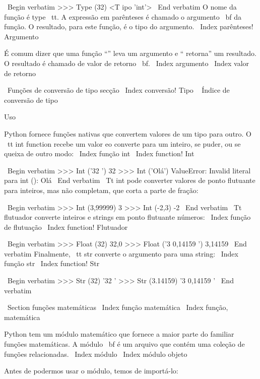\documentclass[10pt]{book}
\begin{document}
{\ Begin {verbatim}
>>> Type (32)
<T ipo 'int'>
\ End {verbatim}
%
O nome da função é {type \ tt}. A expressão em parênteses
é chamado o argumento {\ bf} da função. O resultado, para este
função, é o tipo do argumento.
\ Index {parênteses! Argumento}

É comum dizer que uma função ``'' leva um argumento e `` retorna''
um resultado. O resultado é chamado de valor de retorno {\ bf}.
\ Index {argumento}
\ Index {valor de retorno}


\ {Funções de conversão de tipo} secção
\ Index {conversão! Tipo}
\ {} Índice de conversão de tipo

Uso%


Python fornece funções nativas que convertem valores
de um tipo para outro. O {\ tt int} function recebe um valor eo
converte para um inteiro, se puder, ou se queixa de outro modo:
\ Index {função int}
\ Index {function! Int}

\ Begin {verbatim}
>>> Int ('32 ')
32
>>> Int ('Olá')
ValueError: Invalid literal para int (): Olá
\ End {verbatim}
%
{\ Tt int} pode converter valores de ponto flutuante para inteiros, mas
não completam, que corta a parte de fração:

\ Begin {verbatim}
>>> Int (3,99999)
3
>>> Int (-2,3)
-2
\ End {verbatim}
%
{\ Tt flutuador} converte inteiros e strings em ponto flutuante
números:
\ Index {função de flutuação}
\ Index {function! Flutuador}

\ Begin {verbatim}
>>> Float (32)
32,0
>>> Float ('3 0,14159 ')
3,14159
\ End {verbatim}
%
Finalmente, {\ tt str} converte o argumento para uma string:
\ Index {função str}
\ Index {function! Str}

\ Begin {verbatim}
>>> Str (32)
'32 '
>>> Str (3.14159)
'3 0,14159 '
\ End {verbatim}
%



\ Section {funções matemáticas}
\ Index {função matemática}
\ Index {função, matemática}

Python tem um módulo matemático que fornece a maior parte do familiar
funções matemáticas. A {módulo \ bf} é um arquivo que contém uma
coleção de funções relacionadas.
\ Index {módulo}
\ Index {módulo objeto}

Antes de podermos usar o módulo, temos de importá-lo:

}
\end{document}
